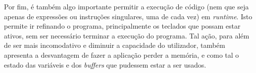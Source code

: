 Por fim, é também algo importante permitir a execução de código (nem que seja apenas de expressões ou instruções singulares, uma de cada vez) em \textit{runtime}. Isto permite ir refinando o programa, principalmente os teclados que possam estar ativos, sem ser necessário terminar a execução do programa. Tal ação, para além de ser mais incomodativo e diminuir a capacidade do utilizador, também apresenta a desvantagem de fazer a aplicação perder a memória, e como tal o estado das variáveis e dos \textit{buffers} que pudessem estar a ser usados.
